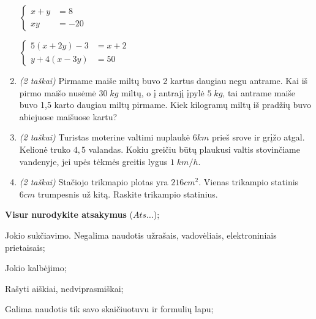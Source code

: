 \documentclass[a4paper]{article}
\begin{document}
\begin{enumerate}
\begin{tasks}[item-format={\normalfont}, after-item-skip=4mm]
                  \task   \par\vspace{-1.3\baselineskip}%
                  $\left\{\begin{aligned}
                              x + y & = 8   \\
                              xy    & = -20
                        \end{aligned}\right.$
                  \task   \par\vspace{-1.3\baselineskip}%
                  $\left\{\begin{aligned}
                              5(x + 2y) -3 & = x+2 \\
                              y+4(x-3y)    & = 50
                        \end{aligned}\right.$
            \end{tasks}
      \item \textit{(2 taškai)} Pirmame maiše miltų buvo 2 kartus daugiau negu antrame. Kai iš pirmo maišo nusėmė $30\; kg$ miltų, o į antrajį įpylė $5\; kg$, tai antrame maiše buvo 1,5 karto daugiau miltų pirmame. Kiek kilogramų miltų iš pradžių buvo abiejuose maišuose kartu?
      \item \textit{(2 taškai)} Turistas moterine valtimi nuplaukė $6 km$ prieš srove ir grįžo atgal. Kelionė truko $4,5$ valandas. Kokiu greičiu būtų plaukusi valtis stovinčiame vandenyje, jei upės tėkmės greitis lygus $1 \; km/h$.
      \item \textit{(2 taškai)} Stačiojo trikmapio plotas yra $216 cm^2$. Vienas trikampio statinis $6 cm$ trumpesnis už kitą. Raskite trikampio statinius.
\end{enumerate}

\begin{small}
      \begin{enumerate*}[label={(\arabic*)}]
            \item \textbf{Visur} \textbf{nurodykite atsakymus} ($Ats\ldots$);
            \item Jokio sukčiavimo. Negalima naudotis užrašais, vadovėliais, elektroniniais
                  prietaisais;
            \item Jokio kalbėjimo;
            \item Rašyti aiškiai, nedviprasmiškai;
            \item Galima naudotis tik savo skaičiuotuvu ir formulių lapu;
      \end{enumerate*}
\end{small}
\end{document}
